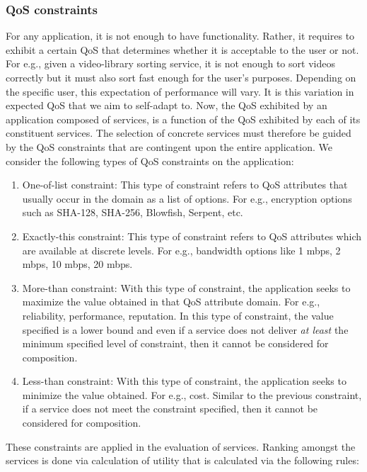 \documentclass[10pt,journal,compsoc]{IEEEtran}
\begin{document}
\subsubsection{QoS constraints}
For any application, it is not enough to have functionality. Rather, it requires to exhibit a certain QoS that determines whether it is acceptable to the user or not. For e.g., given a video-library sorting service, it is not enough to sort videos correctly but it must also sort fast enough for the user's purposes. Depending on the specific user, this expectation of performance will vary. It is this variation in expected QoS that we aim to self-adapt to. Now, the QoS exhibited by an application composed of services, is a function of the QoS exhibited by each of its constituent services. The selection of concrete services must therefore be guided by the QoS constraints that are contingent upon the entire application. We consider the following types of QoS constraints on the application:
\begin{enumerate}
\item One-of-list constraint: This type of constraint refers to QoS attributes that usually occur in the domain as a list of options. For e.g., encryption options such as SHA-128, SHA-256, Blowfish, Serpent, etc.
\item Exactly-this constraint: This type of constraint refers to QoS attributes which are available at discrete levels. For e.g., bandwidth options like 1 mbps, 2 mbps, 10 mbps, 20 mbps.
\item More-than constraint: With this type of constraint, the application seeks to maximize the value obtained in that QoS attribute domain. For e.g., reliability, performance, reputation. In this type of constraint, the value specified is a lower bound and even if a service does not deliver \textit{at least} the minimum specified level of constraint, then it cannot be considered for composition.
\item Less-than constraint: With this type of constraint, the application seeks to minimize the value obtained. For e.g., cost. Similar to the previous constraint, if a service does not meet the constraint specified, then it cannot be considered for composition.
\end{enumerate}
These constraints are applied in the evaluation of services. Ranking amongst the services is done via calculation of utility that is calculated via the following rules:
\end{document}
